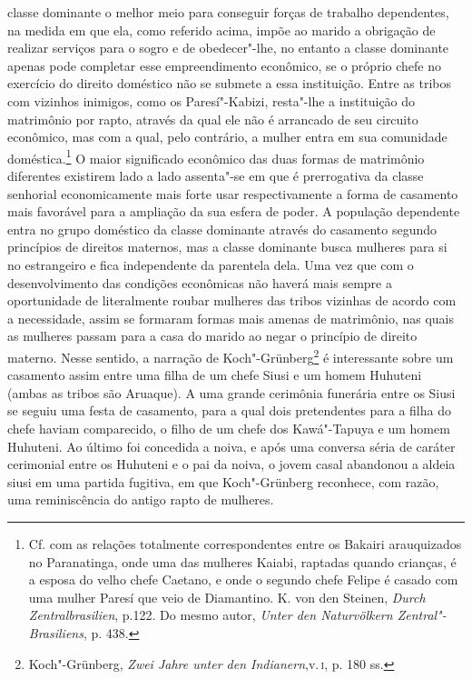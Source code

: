 classe dominante o melhor meio para conseguir forças de trabalho
dependentes, na medida em que ela, como referido acima, impõe ao marido
a obrigação de realizar serviços para o sogro e de obedecer"-lhe, no
entanto a classe dominante apenas pode completar esse empreendimento
econômico, se o próprio chefe no exercício do direito doméstico não se
submete a essa instituição. Entre as tribos com vizinhos inimigos, como
os Paresí"-Kabizi, resta"-lhe a instituição do matrimônio por rapto,
através da qual ele não é arrancado de seu circuito econômico, mas com a
qual, pelo contrário, a mulher entra em sua comunidade
doméstica.\footnote{Cf. com as relações totalmente correspondentes entre
  os Bakairi arauquizados no Paranatinga, onde uma das mulheres Kaiabi,
  raptadas quando crianças, é a esposa do velho chefe Caetano, e onde o
  segundo chefe Felipe é casado com uma mulher Paresí que veio de
  Diamantino. K. von den Steinen, \emph{Durch Zentralbrasilien}, p.122.
  Do mesmo autor, \emph{Unter den Naturvölkern Zentral"-Brasiliens}, p.
  438.} O maior significado econômico das duas formas de matrimônio
diferentes existirem lado a lado assenta"-se em que é prerrogativa da
classe senhorial economicamente mais forte usar respectivamente a forma
de casamento mais favorável para a ampliação da sua esfera de poder. A
população dependente entra no grupo doméstico da classe dominante
através do casamento segundo princípios de direitos maternos, mas a
classe dominante busca mulheres para si no estrangeiro e fica
independente da parentela dela. Uma vez que com o desenvolvimento das
condições econômicas não haverá mais sempre a oportunidade de
literalmente roubar mulheres das tribos vizinhas de acordo com a
necessidade, assim se formaram formas mais amenas de matrimônio, nas
quais as mulheres passam para a casa do marido ao negar o princípio de
direito materno. Nesse sentido, a narração de Koch"-Grünberg\footnote{Koch"-Grünberg,
  \emph{Zwei Jahre unter den Indianern},v.\,\textsc{i}, p. 180 ss.} é interessante
sobre um casamento assim entre uma filha de um chefe Siusi e um homem
Huhuteni (ambas as tribos são Aruaque). A uma grande cerimônia
funerária entre os Siusi se seguiu uma festa de casamento, para a qual
dois pretendentes para a filha do chefe haviam comparecido, o filho de
um chefe dos Kawá"-Tapuya e um homem Huhuteni. Ao último foi concedida a
noiva, e após uma conversa séria de caráter cerimonial entre os Huhuteni
e o pai da noiva, o jovem casal abandonou a aldeia siusi em uma partida
fugitiva, em que Koch"-Grünberg reconhece, com razão, uma reminiscência
do antigo rapto de mulheres.


